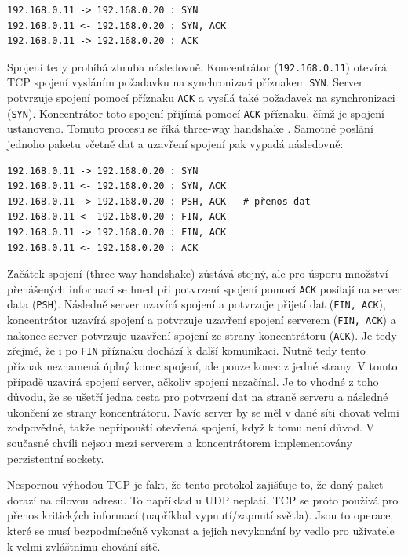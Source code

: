 \begin{verbatim}
192.168.0.11 -> 192.168.0.20 : SYN
192.168.0.11 <- 192.168.0.20 : SYN, ACK
192.168.0.11 -> 192.168.0.20 : ACK
\end{verbatim}

Spojení tedy probíhá zhruba následovně. Koncentrátor (\texttt{192.168.0.11}) otevírá TCP spojení vysláním požadavku na synchronizaci příznakem \texttt{SYN}. Server potvrzuje spojení pomocí příznaku \texttt{ACK} a vysílá také požadavek na synchronizaci (\texttt{SYN}). Koncentrátor toto spojení přijímá pomocí \texttt{ACK} příznaku, čímž je spojení ustanoveno. Tomuto procesu se říká three-way handshake \cite{mistrovstvi}. Samotné poslání jednoho paketu včetně dat a uzavření spojení pak vypadá následovně:

\begin{verbatim}
192.168.0.11 -> 192.168.0.20 : SYN
192.168.0.11 <- 192.168.0.20 : SYN, ACK
192.168.0.11 -> 192.168.0.20 : PSH, ACK   # přenos dat
192.168.0.11 <- 192.168.0.20 : FIN, ACK
192.168.0.11 -> 192.168.0.20 : FIN, ACK
192.168.0.11 <- 192.168.0.20 : ACK
\end{verbatim}

Začátek spojení (three-way handshake) zůstává stejný, ale pro úsporu množství přenášených informací se hned při potvrzení spojení pomocí \texttt{ACK} posílají na server data (\texttt{PSH}). Následně server uzavírá spojení a potvrzuje přijetí dat (\texttt{FIN, ACK}), koncentrátor uzavírá spojení a potvrzuje uzavření spojení serverem (\texttt{FIN, ACK}) a nakonec server potvrzuje uzavření spojení ze strany koncentrátoru (\texttt{ACK}). Je tedy zřejmé, že i po \texttt{FIN} příznaku dochází k další komunikaci. Nutně tedy tento příznak neznamená úplný konec spojení, ale pouze konec z jedné strany. V tomto případě uzavírá spojení server, ačkoliv spojení nezačínal. Je to vhodné z toho důvodu, že se ušetří jedna cesta pro potvrzení dat na straně serveru a následné ukončení ze strany koncentrátoru. Navíc server by se měl v dané síti chovat velmi zodpovědně, takže nepřipouští otevřená spojení, když k tomu není důvod. V současné chvíli nejsou mezi serverem a koncentrátorem implementovány perzistentní sockety.

Nespornou výhodou TCP je fakt, že tento protokol zajišťuje to, že daný paket dorazí na cílovou adresu. To například u UDP neplatí. TCP se proto používá pro přenos kritických informací (například vypnutí/zapnutí světla). Jsou to operace, které se musí bezpodmínečně vykonat a jejich nevykonání by vedlo pro uživatele k velmi zvláštnímu chování sítě.

